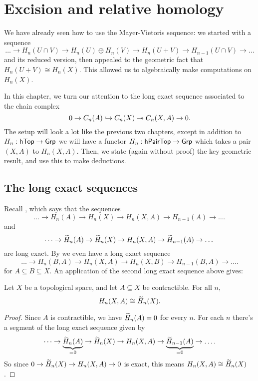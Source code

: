 \chapter{Excision and relative homology}
We have already seen how to use the Mayer-Vietoris sequence:
we started with a sequence
\[ \dots \to H_n(U \cap V) \to H_n(U) \oplus H_n(V) \to H_n(U+V) \to H_{n-1}(U \cap V) \to \dots \]
and its reduced version,
then appealed to the geometric fact that $H_n(U+V) \cong H_n(X)$.
This allowed us to algebraically make computations on $H_n(X)$.

In this chapter, we turn our attention to the long exact
sequence associated to the chain complex
\[ 0 \to C_n(A) \hookrightarrow C_n(X) \twoheadrightarrow C_n(X,A) \to 0. \]
The setup will look a lot like the previous two chapters,
except in addition to $H_n : \mathsf{hTop} \to \mathsf{Grp}$
we will have a functor $H_n : \mathsf{hPairTop} \to \mathsf{Grp}$
which takes a pair $(X,A)$ to $H_n(X,A)$.
Then, we state (again without proof) the key geometric result,
and use this to make deductions.

\section{The long exact sequences}
Recall , which says that the sequences
\[ \dots \to H_n(A) \to H_n(X) \to H_n(X,A) \to H_{n-1}(A) \to \dots. \]
and
\[ \dots \to \widetilde H_n(A) \to \widetilde H_n(X) \to H_n(X,A) \to \widetilde H_{n-1}(A) \to \dots \]
are long exact.
By  we even have a long exact sequence
\[
	\dots
	\to H_n(B,A)
	\to H_n(X,A)
	\to H_n(X,B)
	\to H_{n-1}(B,A)
	\to \dots.
\]
for $A \subseteq B \subseteq X$.
An application of the second long exact sequence above gives:
\begin{lemma}
	\label{lem:rel_contractible}
	Let $X$ be a topological space,
	and let $A \subseteq X$ be contractible.
	For all $n$, \[ H_n(X, A) \cong \widetilde H_n(X). \]
\end{lemma}
\begin{proof}
	Since $A$ is contractible, we have $\widetilde H_n(A) = 0$ for every $n$.
	For each $n$ there's a segment of the long exact sequence given by
	\[ \dots \to \underbrace{\widetilde H_n(A)}_{=0} \to \widetilde H_n(X) \to H_n(X,A)
	\to \underbrace{\widetilde H_{n-1}(A)}_{=0} \to \dots. \]
	So since $0 \to \widetilde H_n(X) \to H_n(X,A) \to 0$ is exact,
	this means $H_n(X,A) \cong \widetilde H_n(X)$.
\end{proof}

